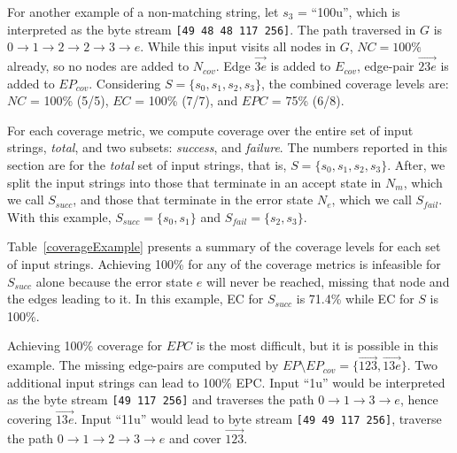 For another example of a non-matching string, let $s_3$ = ``100u'', which is interpreted as the byte stream {\tt [49 48 48 117 256]}. 
The path traversed in $G$ is $0 \rightarrow 1 \rightarrow 2 \rightarrow 2 \rightarrow3 \rightarrow e$.
While this input visits all nodes in $G$, $NC = 100\%$ already, so no nodes are added to $N_{cov}$.
 Edge $\overrightarrow{3e}$ is added to $E_{cov}$, edge-pair $\overrightarrow{23e}$ is added to $EP_{cov}$. 
Considering $S = \{s_0, s_1, s_2, s_3\}$, the combined coverage levels are: $NC$ = 100\% (5/5), $EC$ = 100\% (7/7), and $EPC$ =  75\% (6/8). 


For each coverage metric, we compute coverage over the entire set of input strings, \emph{total}, and two subsets: \emph{success}, and \emph{failure}. 
The numbers reported in this section are for the \emph{total} set of input strings, that is, $S = \{s_0, s_1, s_2, s_3\}$. 
After, we split the input strings into those that terminate in an accept state in $N_m$, which we call $S_{succ}$, and those that  terminate in the error state $N_e$, which we call $S_{fail}$. With this example, $S_{succ} = \{s_0, s_1\}$ and $S_{fail} = \{s_2, s_3\}$.

Table~\ref{coverageExample} presents a summary of the coverage levels for each set of input strings. 
Achieving 100\% for any of the coverage metrics is infeasible for $S_{succ}$ alone because the error state $e$ will never be reached, missing that node and the edges leading to it. 
In this example,  EC for $S_{succ}$ is 71.4\% while EC for $S$ is 100\%.

Achieving 100\% coverage for $EPC$ is the most difficult, but it is possible in this example. 
 The missing edge-pairs are computed by $EP \setminus EP_{cov} = \{\overrightarrow{123}, \overrightarrow{13e}\}$. Two additional input strings can lead to 100\% EPC. Input ``1u'' would be interpreted as the byte stream {\tt [49 117 256]} and traverses the path $0 \rightarrow 1 \rightarrow 3 \rightarrow e$, hence covering $\overrightarrow{13e}$. Input ``11u'' would lead to byte stream {\tt [49 49 117 256]}, traverse the path  $0 \rightarrow 1 \rightarrow 2 \rightarrow  3 \rightarrow e$ and cover $\overrightarrow{123}$. 

